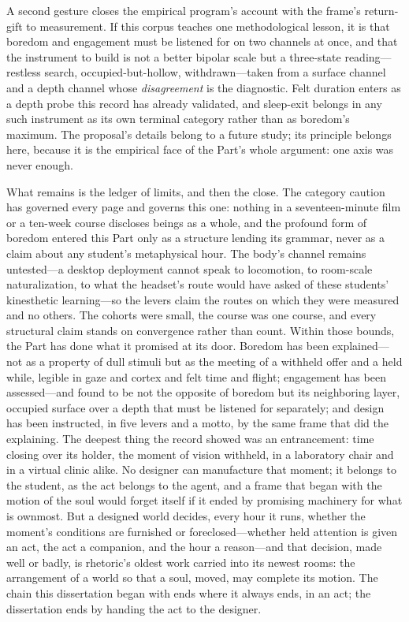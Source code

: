 A second gesture closes the empirical program's account with the frame's return-gift to measurement. If this corpus teaches one methodological lesson, it is that boredom and engagement must be listened for on two channels at once, and that the instrument to build is not a better bipolar scale but a three-state reading---restless search, occupied-but-hollow, withdrawn---taken from a surface channel and a depth channel whose \textit{disagreement} is the diagnostic. Felt duration enters as a depth probe this record has already validated, and sleep-exit belongs in any such instrument as its own terminal category rather than as boredom's maximum. The proposal's details belong to a future study; its principle belongs here, because it is the empirical face of the Part's whole argument: one axis was never enough.

What remains is the ledger of limits, and then the close. The category caution has governed every page and governs this one: nothing in a seventeen-minute film or a ten-week course discloses beings as a whole, and the profound form of boredom entered this Part only as a structure lending its grammar, never as a claim about any student's metaphysical hour. The body's channel remains untested---a desktop deployment cannot speak to locomotion, to room-scale naturalization, to what the headset's route would have asked of these students' kinesthetic learning---so the levers claim the routes on which they were measured and no others. The cohorts were small, the course was one course, and every structural claim stands on convergence rather than count. Within those bounds, the Part has done what it promised at its door. Boredom has been explained---not as a property of dull stimuli but as the meeting of a withheld offer and a held while, legible in gaze and cortex and felt time and flight; engagement has been assessed---and found to be not the opposite of boredom but its neighboring layer, occupied surface over a depth that must be listened for separately; and design has been instructed, in five levers and a motto, by the same frame that did the explaining. The deepest thing the record showed was an entrancement: time closing over its holder, the moment of vision withheld, in a laboratory chair and in a virtual clinic alike. No designer can manufacture that moment; it belongs to the student, as the act belongs to the agent, and a frame that began with the motion of the soul would forget itself if it ended by promising machinery for what is ownmost. But a designed world decides, every hour it runs, whether the moment's conditions are furnished or foreclosed---whether held attention is given an act, the act a companion, and the hour a reason---and that decision, made well or badly, is rhetoric's oldest work carried into its newest rooms: the arrangement of a world so that a soul, moved, may complete its motion. The chain this dissertation began with ends where it always ends, in an act; the dissertation ends by handing the act to the designer.

